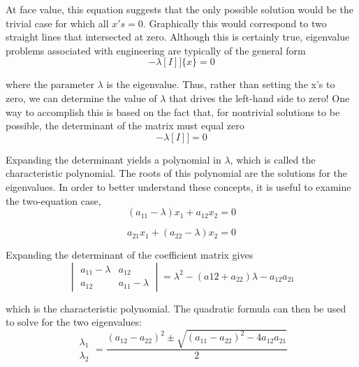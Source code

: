 \documentclass[../main.tex]{subfiles}
\begin{document}
At face value, this equation suggests that the only possible solution would be the trivial
case for which all $x's = 0$. Graphically this would correspond to two straight lines that intersected at zero.
Although this is certainly true, eigenvalue problems associated with engineering are
typically of the general form
\begin{equation}
[[A]-\lambda[I]]\{x\}=0 \tag{13.3}
\end{equation}

where the parameter $\lambda$ is the eigenvalue. Thus, rather than setting the x's to zero, we can
determine the value of $\lambda$ that drives the left-hand side to zero! One way to accomplish this
is based on the fact that, for nontrivial solutions to be possible, the determinant of the matrix must equal zero
\begin{equation}
[[A]-\lambda[I]]=0 \tag{13.4}
\end{equation}

Expanding the determinant yields a polynomial in $\lambda$, which is called the characteristic
polynomial. The roots of this polynomial are the solutions for the eigenvalues.
In order to better understand these concepts, it is useful to examine the two-equation
case,
\begin{equation}
(a_{11}-\lambda)x_{1}+a_{12}x_{2}=0
\end{equation}

\begin{equation}
a_{21}x_{1}+(a_{22}-\lambda)x_{2}=0 \tag{13.5}
\end{equation}

Expanding the determinant of the coefficient matrix gives
\begin{equation}
\begin{vmatrix}
a_{11}-\lambda  &a_{12} \\
a_{12} & a_{11}-\lambda
\end{vmatrix}
=\lambda ^{2}-(a{12}+a_{22})\lambda -a_{12}a_{21} \tag{13.6}
\end{equation}


which is the characteristic polynomial. The quadratic formula can then be used to solve for
the two eigenvalues:
\begin{equation}
\begin{matrix}
\lambda _{1}\\
\lambda _{2}
\end{matrix}
=\frac{(a_{12}-a_{22})^{2}\pm \sqrt{(a_{11}-a_{22})^{2}-4a_{12}a_{21}}}{2} \tag{13.7}
\end{equation}
\end{document}
